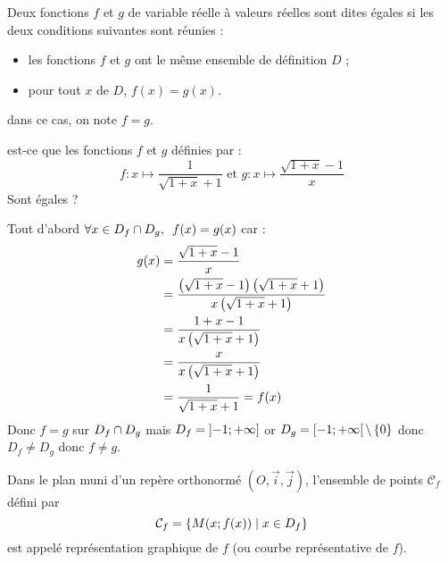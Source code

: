 \begin{defprop}
	Deux fonctions \(f\) et \(g\) de variable réelle à valeurs réelles sont dites égales si les deux conditions suivantes sont réunies :
	\begin{itemize}
		\item les fonctions \(f\) et \(g\) ont le même ensemble de définition \(D\) ;
		\item pour tout \(x\) de \(D\), \(f(x) = g(x)\).
	\end{itemize}
	dans ce cas, on note \(f = g\).
\end{defprop}

\begin{exoex}
	est-ce que les fonctions \(f\) et \(g\) définies par :
	\[f: x\mapsto\frac{1}{\sqrt{1+x}+1} \text{ et } g:  x\mapsto\frac{\sqrt{1+x}-1}{x}\]
	Sont égales ?
\end{exoex}
\begin{corr}
	Tout d'abord \(\quantifs{\forall x \in D_f\inter D_g} f(x) = g(x)\) car :
	\begin{align*} g(x) & = \frac{\sqrt{1+x}-1}{x}                                                 \\
                    & = \frac{\left(\sqrt{1+x}-1\right)\left(\sqrt{1+x}+1\right)}{x\left(\sqrt{1+x}+1\right)} \\
                    & = \frac{1+x-1}{x\left(\sqrt{1+x}+1\right)}                                    \\
                    & = \frac{x}{x\left(\sqrt{1+x}+1\right)}                                        \\
                    & = \frac{1}{\sqrt{1+x}+1} = f(x)
	\end{align*}
	Donc \(f = g\) sur \(D_f\cap D_g\) mais
	\(D_f = \left]-1;+\infty\right]\) or \(D_g = \left[-1;+\infty\right[\backslash\left\lbrace0\right\rbrace\) donc \(D_f \neq D_g\) donc \(f \neq g\).
\end{corr}

\begin{defi}
	Dans le plan muni d’un repère orthonormé \((O, \vec{i}, \vec{j})\), l’ensemble de points \(\mathcal{C}_f\) défini par
	\[
		\mathcal{C}_f = \left\lbrace M(x; f(x)) \;\middle|\; x \in D_f \right\rbrace
	\]
	est appelé représentation graphique de \(f\) (ou courbe représentative de \(f\)).
\end{defi}


